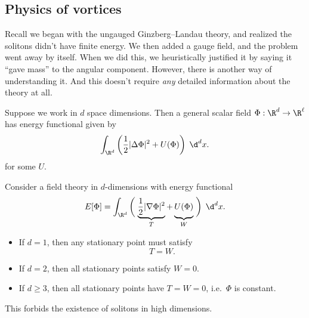 \documentclass[a4paper]{article}
\begin{document}
\subsection{Physics of vortices}
Recall we began with the ungauged Ginzberg--Landau theory, and realized the solitons didn't have finite energy. We then added a gauge field, and the problem went away by itself. When we did this, we heuristically justified it by saying it ``gave mass'' to the angular component. However, there is another way of understanding it. And this doesn't require \emph{any} detailed information about the theory at all.

Suppose we work in $d$ space dimensions. Then a general scalar field $\Phi: \R^d \to \R^\ell$ has energy functional given by
\[
  \int_{\R^d} \left(\frac{1}{2} |\Delta \Phi|^2 + U(\Phi)\right)\;\d^d x.
\]
for some $U$.

\begin{thm}
  Consider  a field theory in $d$-dimensions with energy functional
  \[
    E[\Phi] = \int_{\R^d}\left(\vphantom{\frac{1}{2}}\right.\underbrace{\frac{1}{2} |\nabla \Phi|^2}_{T} + \underbrace{U(\Phi)\vphantom{\frac{1}{2}}}_W\left.\vphantom{\frac{1}{2}}\right)\;\d^d x.
  \]
  \begin{itemize}
    \item If $d = 1$, then any stationary point must satisfy
      \[
        T = W.
      \]
    \item If $d = 2$, then all stationary points satisfy $W = 0$.
    \item If $d \geq 3$, then all stationary points have $T = W = 0$, i.e.\ $\Phi$ is constant.
  \end{itemize}
\end{thm}
This forbids the existence of solitons in high dimensions.
\end{document}
